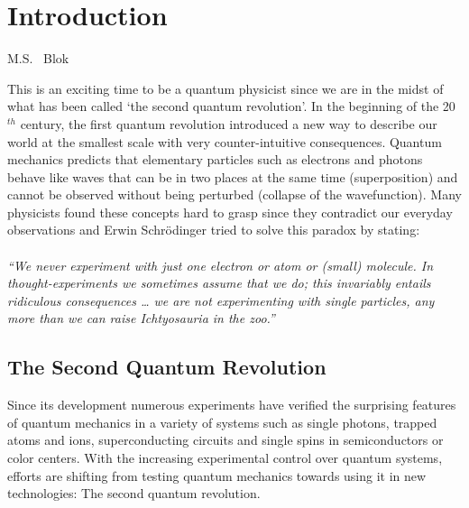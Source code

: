\graphicspath{{./ch_introduction/figures/}}

\chapter{Introduction}
\label{ch:intro}

\begin{center} 
    \vspace{-1cm} {M.S. ~Blok} 
\end{center}

This is an exciting time to be a quantum physicist since we are in the midst of what has been called `the second quantum revolution'\cite{Dowling__2003}.
In the beginning of the 20$^{th}$ century, the first quantum revolution introduced a new way to describe our world at the smallest scale with very counter-intuitive consequences. Quantum mechanics predicts that elementary particles such as electrons and photons behave like waves that can be in two places at the same time (superposition) and cannot be observed without being perturbed (collapse of the wavefunction). Many physicists found these concepts hard to grasp since they contradict our everyday observations and Erwin Schr\"{o}dinger tried to solve this paradox by stating\cite{Schrodinger__1952}: 
\\
\\
\textit{``We never experiment with just one electron or atom or (small) molecule. In  thought-experiments we sometimes assume that we do; this invariably entails ridiculous consequences … we are not experimenting with single particles, any more than we can raise Ichtyosauria in the zoo.''}
\\

\section{The Second Quantum Revolution}
Since its development numerous experiments have verified the surprising features of quantum mechanics in a variety of systems such as single photons, trapped atoms and ions, superconducting circuits and single spins in semiconductors or color centers. With the increasing experimental control over quantum systems, efforts are shifting from testing quantum mechanics towards using it in new technologies: The second quantum revolution.

